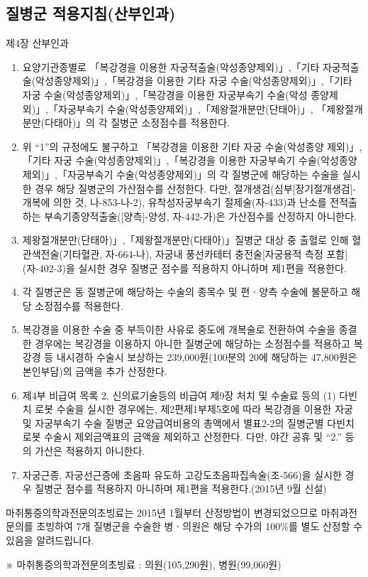 \subsection{질병군 적용지침(산부인과)}
제4장 산부인과
\begin{enumerate}[(1)]\tightlist
\item 요양기관종별로 「복강경을 이용한 자궁적출술(악성종양제외)」,「기타 자궁적출술(악성종양제외)」,「복강경을 이용한 기타 자궁 수술(악성종양제외)」,「기타 자궁 수술(악성종양제외)」,「복강경을 이용한 자궁부속기 수술(악성 종양제외)」,「자궁부속기 수술(악성종양제외)」,「제왕절개분만(단태아)」,
「제왕절개분만(다태아)」의 각 질병군 소정점수를 적용한다.
\item 위 “1”의 규정에도 불구하고 「복강경을 이용한 기타 자궁 수술(악성종양 제외)」,「기타 자궁 수술(악성종양제외)」,「복강경을 이용한 자궁부속기
수술(악성종양제외)」,「자궁부속기 수술(악성종양제외)」의 각 질병군에 해당하는 수술을 실시한 경우 해당 질병군의 가산점수를 산정한다. 다만, 절개생검(심부[장기절개생검]-개복에 의한 것, 나-853-나-2), 유착성자궁부속기 절제술(자-433)과 난소를 전적출하는 부속기종양적출술([양측]-양성, 자-442-가)은
가산점수를 산정하지 아니한다.
\item 제왕절개분만(단태아)」,「제왕절개분만(다태아)」질병군 대상 중 출혈로 인해 혈관색전술(기타혈관, 자-664-나), 자궁내 풍선카테터 충전술[자궁용적
측정 포함](자-402-3)을 실시한 경우 질병군 점수를 적용하지 아니하며 제1편을 적용한다.
\item 각 질병군은 동 질병군에 해당하는 수술의 종목수 및 편ㆍ양측 수술에 불문하고 해당 소정점수를 적용한다.
\item 복강경을 이용한 수술 중 부득이한 사유로 중도에 개복술로 전환하여 수술을 종결한 경우에는 복강경을 이용하지 아니한 질병군에 해당하는 소정점수를 적용하고 복강경 등 내시경하 수술시 보상하는 239,000원(100분의 20에 해당하는 47,800원은 본인부담)의 금액을 추가 산정한다.
\item 제4부 비급여 목록 2. 신의료기술등의 비급여 제9장 처치 및 수술료 등의 (1) 다빈치 로봇 수술을 실시한 경우에는, 제2편제1부제5호에 따라 복강경을 이용한 자궁 및 자궁부속기 수술 질병군 요양급여비용의 총액에서 별표2-2의 질병군별 다빈치 로봇 수술시 제외금액표의 금액을 제외하고
산정한다. 다만, 야간\cntrdot{} 공휴 및 “2.” 등의 가산은 적용하지 아니한다.
\item 자궁근종, 자궁선근증에 초음파 유도하 고강도초음파집속술(조-566)을 실시한 경우 질병군 점수를 적용하지 아니하며 제1편을 적용한다.(2015년 9월 신설)
\end{enumerate}

\begin{mdframed}[linecolor=blue,middlelinewidth=2]
마취통증의학과전문의초빙료는 2015년 1월부터 산정방법이 변경되었으므로 마취과전문의를 초빙하여 7개 질병군을 수술한 병ㆍ의원은 해당 수가의 100\%를 별도 산정할 수 있음을 알려드립니다.\par
※ 마취통증의학과전문의초빙료 : 의원(105,290원), 병원(99,060원)
\end{mdframed}
